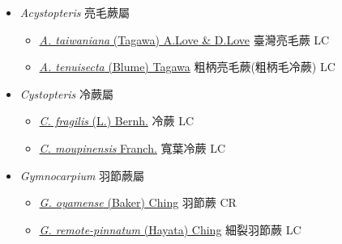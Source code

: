 
  \begin{itemize}
 \item[] \textit{Acystopteris} 亮毛蕨屬
                    
  \begin{itemize}
        \item[] \href{http://www.theplantlist.org/tpl1.1/search?q=Acystopteris+taiwaniana}{\textit{A. taiwaniana} (Tagawa) A.Love \& D.Love}   臺灣亮毛蕨 LC
        \item[] \href{http://www.theplantlist.org/tpl1.1/search?q=Acystopteris+tenuisecta}{\textit{A. tenuisecta} (Blume) Tagawa}     粗柄亮毛蕨(粗柄毛冷蕨)   LC
  \end{itemize}
 \item[] \textit{Cystopteris} 冷蕨屬
                    
  \begin{itemize}
        \item[] \href{http://www.theplantlist.org/tpl1.1/search?q=Cystopteris+fragilis}{\textit{C. fragilis} (L.) Bernh.}   冷蕨 LC
        \item[] \href{http://www.theplantlist.org/tpl1.1/search?q=Cystopteris+moupinensis}{\textit{C. moupinensis} Franch.}   寬葉冷蕨 LC
  \end{itemize}
 \item[] \textit{Gymnocarpium} 羽節蕨屬
                    
  \begin{itemize}
        \item[] \href{http://www.theplantlist.org/tpl1.1/search?q=Gymnocarpium+oyamense}{\textit{G. oyamense} (Baker) Ching}   羽節蕨 CR
        \item[] \href{http://www.theplantlist.org/tpl1.1/search?q=Gymnocarpium+remote-pinnatum}{\textit{G. remote-pinnatum} (Hayata) Ching}   細裂羽節蕨 LC
  \end{itemize}
  \end{itemize}
